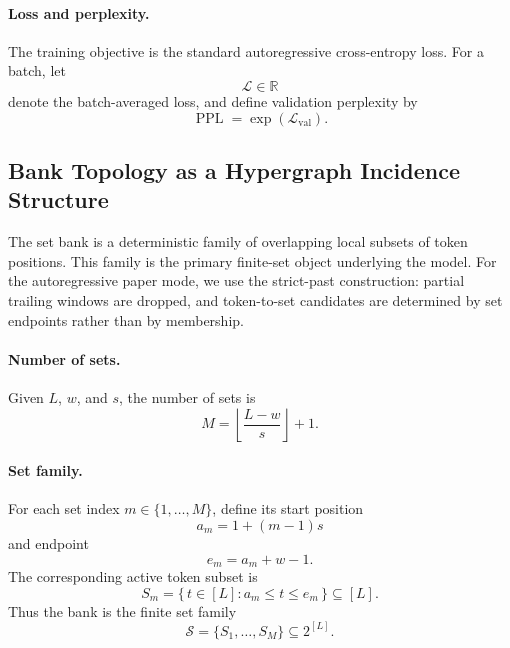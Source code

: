\documentclass{article}
\theoremstyle{plain}
\theoremstyle{definition}
\theoremstyle{remark}
\begin{document}
\paragraph{Loss and perplexity.}
The training objective is the standard autoregressive cross-entropy loss. For a batch, let
\begin{equation}
\label{eq:loss}
\mathcal{L}\in\mathbb{R}
\end{equation}
denote the batch-averaged loss, and define validation perplexity by
\begin{equation}
\label{eq:perplexity}
\operatorname{PPL}=\exp(\mathcal{L}_{\mathrm{val}}).
\end{equation}

\subsection{Bank Topology as a Hypergraph Incidence Structure}
\label{sec:bank-topology}

The set bank is a deterministic family of overlapping local subsets of token positions. This family is the primary finite-set object underlying the model. For the autoregressive paper mode, we use the strict-past construction: partial trailing windows are dropped, and token-to-set candidates are determined by set endpoints rather than by membership.

\paragraph{Number of sets.}
Given $L$, $w$, and $s$, the number of sets is
\begin{equation}
\label{eq:num-sets}
M=\left\lfloor\frac{L-w}{s}\right\rfloor+1.
\end{equation}

\paragraph{Set family.}
For each set index $m\in\{1,\dots,M\}$, define its start position
\begin{equation}
\label{eq:set-start}
a_m=1+(m-1)s
\end{equation}
and endpoint
\begin{equation}
\label{eq:set-endpoint}
e_m=a_m+w-1.
\end{equation}
The corresponding active token subset is
\begin{equation}
\label{eq:set-definition}
S_m=\{\,t\in[L]: a_m\le t\le e_m\,\}\subseteq[L].
\end{equation}
Thus the bank is the finite set family
\begin{equation}
\label{eq:set-family}
\mathcal{S}=\{S_1,\dots,S_M\}\subseteq 2^{[L]}.
\end{equation}
\end{document}
